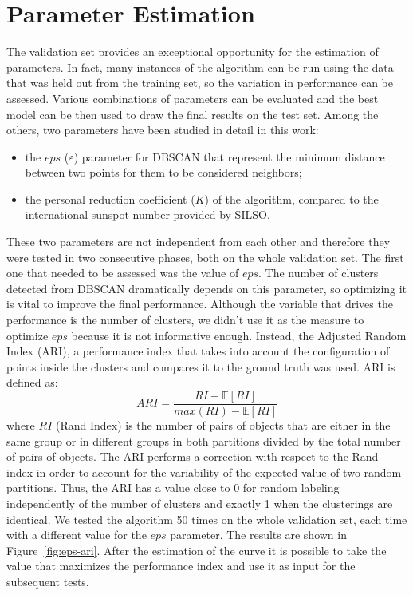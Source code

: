 \section{Parameter Estimation}
The validation set provides an exceptional opportunity for the estimation of parameters. In fact, many instances of the algorithm can be run using the data that was held out from the training set, so the variation in performance can be assessed. Various combinations of parameters can be evaluated and the best model can be then used to draw the final results on the test set.
Among the others, two parameters have been studied in detail in this work:
\begin{itemize}
  \item the $eps$ ($\varepsilon$) parameter for DBSCAN that represent the minimum distance between two points for them to be considered neighbors;
  \item the personal reduction coefficient ($K$) of the algorithm, compared to the international sunspot number provided by SILSO.
\end{itemize}
These two parameters are not independent from each other and therefore they were tested in two consecutive phases, both on the whole validation set.
\bigbreak
\noindent The first one that needed to be assessed was the value of $eps$. The number of clusters detected from DBSCAN dramatically depends on this parameter, so optimizing it is vital to improve the final performance. Although the variable that drives the performance is the number of clusters, we didn't use it as the measure to optimize $eps$ because it is not informative enough. Instead, the Adjusted Random Index (ARI), a performance index that takes into account the configuration of points inside the clusters and compares it to the ground truth was used. ARI is defined as:
\begin{equation}
ARI = \frac{RI-\mathbb{E}[RI]}{max(RI)-\mathbb{E}[RI]}
\end{equation}
where $RI$ (Rand Index) is the number of pairs of objects that are either in the same group or in different groups in both partitions divided by the total number of pairs of objects. The ARI performs a correction with respect to the Rand index in order to account for the variability of the expected value of two random partitions. Thus, the ARI has a value close to 0 for random labeling independently of the number of clusters and exactly 1 when the clusterings are identical.
\bigbreak
\noindent We tested the algorithm 50 times on the whole validation set, each time with a different value for the $eps$ parameter. The results are shown in Figure~\ref{fig:eps-ari}. After the estimation of the curve it is possible to take the value that maximizes the performance index and use it as input for the subsequent tests.
